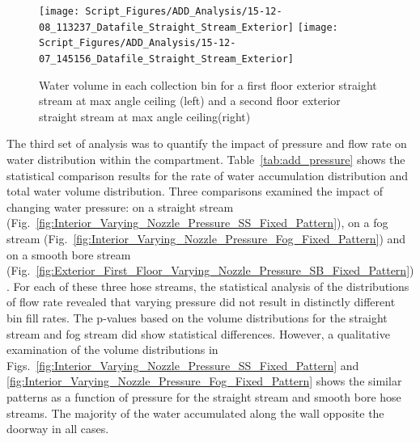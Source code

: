 \documentclass{article}
\begin{document}
\begin{figure}[ht]
\texttt{[image: Script\_Figures/ADD\_Analysis/15-12-08\_113237\_Datafile\_Straight\_Stream\_Exterior]}
\texttt{[image: Script\_Figures/ADD\_Analysis/15-12-07\_145156\_Datafile\_Straight\_Stream\_Exterior]} \\ 
\caption{Water volume in each collection bin for a first floor exterior straight stream at max angle ceiling (left) and a second floor exterior straight stream at max angle ceiling(right)}
\label{fig:Exterior_First_Floor_Second_Floor}
\end{figure}

\clearpage

The third set of analysis was to quantify the impact of pressure and flow rate on water distribution within the compartment. Table~\ref{tab:add_pressure} shows the statistical comparison results for the rate of water accumulation distribution and total water volume distribution. Three comparisons examined the impact of changing water pressure: on a straight stream (Fig.~\ref{fig:Interior_Varying_Nozzle_Pressure_SS_Fixed_Pattern}), on a fog stream (Fig.~\ref{fig:Interior_Varying_Nozzle_Pressure_Fog_Fixed_Pattern}) and on a smooth bore stream (Fig.~\ref{fig:Exterior_First_Floor_Varying_Nozzle_Pressure_SB_Fixed_Pattern}). For each of these three hose streams, the statistical analysis of the distributions of flow rate revealed that varying pressure did not result in distinctly different bin fill rates. The p-values based on the volume distributions for the straight stream and fog stream did show statistical differences. However, a qualitative examination of the volume distributions in Figs.~\ref{fig:Interior_Varying_Nozzle_Pressure_SS_Fixed_Pattern} and \ref{fig:Interior_Varying_Nozzle_Pressure_Fog_Fixed_Pattern} shows the similar patterns as a function of pressure for the straight stream and smooth bore hose streams. The majority of the water accumulated along the wall opposite the doorway in all cases.
\end{document}
